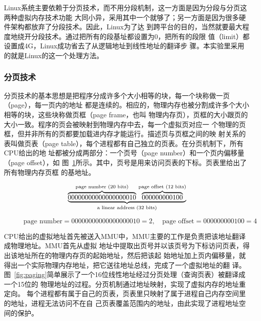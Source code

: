 \documentclass{swfuthesism}
\begin{document}
Linux系统主要依赖于分页技术，而不用分段机制，这一方面是因为分段与分页这两种虚拟内存技术功能
大同小异，采用其中一个就够了；另一方面是因为很多硬件架构都放弃了分段技术。因此，Linux为了达
到跨平台的目的，当然就要最大程度地绕开分段技术。通过把所有的段基址都设置为0，把所有的段限
值（limit）都设置成4G，Linux成功省去了从逻辑地址到线性地址的翻译步
骤\cite{gorman2004understanding}。本实验里采用的就是Linux的这一个处理方法。

\subsubsection{分页技术}

分页技术的基本思想是把程序分成许多个大小相等的块，每一个块称做一页（page），每一页内的地址
都是连续的。相应的，物理内存也被分割成许多个大小相等的块，这些块称做页框（page frame，也叫
物理内存页），页框的大小跟页的大小一致。程序的页会被映射到物理内存中去，每一个虚拟页对应一
个物理的页框，但并非所有的页都要加载进内存才能运行\cite{Sibasankar2010}。描述页与页框之间的映
射关系的表叫做页表（page table），每个进程都有自己独立的页表。在分页机制下，所有CPU给出的地
址都被分成两部分：一个页号（page number）和一个页内偏移量（page offset），如
图~\ref{fig:linear-addr}所示。其中，页号是用来访问页表的下标。页表里给出了所有物理内存页框
的基地址。

\begin{figure}[!ht]
  \centering
  \begin{Large}
    \[%
      \underbrace{%
        \overbrace{00000000000000000010}^{\text{page number (20 bits)}}\,%
        \overbrace{000000000100}^{\text{page offset (12 bits)}}}_{\text{a linear address
          (32 bits)}}%
    \]
  \end{Large}
    \begin{small}
      \[\text{page number}=00000000000000000010=2, \quad \text{page offset}=000000000100=4\]
    \end{small}  
  \label{fig:linear-addr}
\end{figure}

CPU给出的虚拟地址首先被送入MMU中，MMU主要的工作是负责把该地址翻译成物理地址。MMU首先从虚拟
地址中提取出页号并以该页号为下标访问页表，得出该地址所在的物理内存页的起始地址，然后把该起
始地址加上页内偏移量，就得出一个实际物理内存地址，把它送往地址总线，完成了一个虚拟地址的翻
译。图~\ref{fig:paging}简单展示了一个16位线性地址经过分页处理（查询页表）被翻译成一个15位的
物理地址的过程\cite{tanenbaum2008modern}。分页机制通过地址映射，实现了虚拟内存的地址重定向。
每个进程都有属于自己的页表，页表里只映射了属于进程自己内存空间里的地址，进程无法访问不在自
己页表覆盖范围内的地址，由此实现了进程地址空间的保护。
\end{document}
